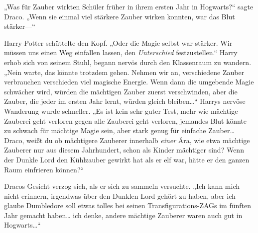 „Was für Zauber wirkten Schüler früher in ihrem ersten Jahr in Hogwarts?“ sagte Draco. „Wenn sie einmal viel stärkere Zauber wirken konnten, war das Blut stärker—“

Harry Potter schüttelte den Kopf. „Oder die Magie selbst war stärker. Wir müssen uns einen Weg einfallen lassen, den \emph{Unterschied} festzustellen.“ Harry erhob sich von seinem Stuhl, begann nervös durch den Klassenraum zu wandern. „Nein warte, das könnte trotzdem gehen. Nehmen wir an, verschiedene Zauber verbrauchen verschieden viel magische Energie. Wenn dann die umgebende Magie schwächer wird, würden die mächtigen Zauber zuerst verschwinden, aber die Zauber, die jeder im ersten Jahr lernt, würden gleich bleiben…“ Harrys nervöse Wanderung wurde schneller. „Es ist kein sehr guter Test, mehr wie mächtige Zauberei geht verloren gegen alle Zauberei geht verloren, jemandes Blut könnte zu schwach für mächtige Magie sein, aber stark genug für einfache Zauber… Draco, weißt du ob mächtigere Zauberer innerhalb \emph{einer} Ära, wie etwa mächtige Zauberer nur aus diesem Jahrhundert, schon als Kinder mächtiger sind? Wenn der Dunkle Lord den Kühlzauber gewirkt hat als er elf war, hätte er den ganzen Raum einfrieren können?“

Dracos Gesicht verzog sich, als er sich zu sammeln versuchte. „Ich kann mich nicht erinnern, irgendwas über den Dunklen Lord gehört zu haben, aber ich glaube Dumbledore soll etwas tolles bei seinen Transfigurations-ZAGs im fünften Jahr gemacht haben… ich denke, andere mächtige Zauberer waren auch gut in Hogwarts…“


